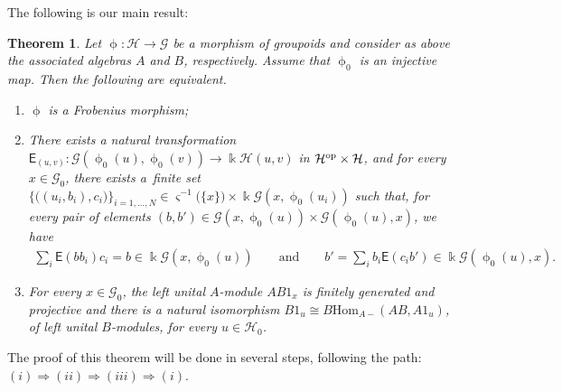 \documentclass[10pt,a4paper]{amsart}
\numberwithin{equation}{section}
\newtheorem{Theorem}{Theorem}[section]
\newcommand{\Sf}[1]{\mathsf{#1}}
\renewcommand{\hom}[3]{\mathrm{Hom}_{\Sscript{#1}}\left(#2, #3\right)}
\newcommand{\Go}{\cG_{\Sscript{0}}}
\newcommand{\Ho}{\cH_{\Sscript{0}}}
\newcommand{\cG}{{\mathcal G}}
\newcommand{\cH}{{\mathcal H}}
\newcommand{\Sscript}[1]{\scriptscriptstyle{#1}}
\newcommand{\phio}{\upphi_{\Sscript{0}}}
\begin{document}
The following is our main result:

\begin{Theorem}\label{thm:FM}Let $\upphi\colon \cH \to \cG$ be a morphism of groupoids and consider as above the associated algebras $A$ and $B$, respectively. Assume that $\upphi_{\Sscript{0}}$ is an injective map. Then the following are equivalent.
\begin{enumerate}[$(i)$]\itemsep=0pt
\item $\upphi$ is a Frobenius morphism;
\item There exists a natural transformation $\Sf{E}_{\Sscript{(u, v)}}\colon \cG(\phio(u),\phio(v)) \longrightarrow \Bbbk \cH(u,v)$ in $\cH^{\rm op} \times \cH$, and for every $x \in \Go$, there exists a~finite set
$\{\big((u_{i},b_{i}), c_{i}\big)\}_{i=1, \dots, N} \in \varsigma^{-1}\big( \{x\}\big)\times \Bbbk \cG(x, \phio(u_{i}))$ such that, for every pair of elements $ (b, b') \in \cG(x, \phio(u)) \times \cG(\phio(u), x)$, we have
\begin{gather*}
\sum_{i}\Sf{E}(bb_{i})c_{i} = b \in \Bbbk \cG(x, \phio(u)) \qquad \text{and} \qquad b' = \sum_{i}b_{i}\Sf{E}(c_{i}b') \in \Bbbk \cG(\phio(u), x).
\end{gather*}
\item For every $x\in \Go$, the left unital $A$-module $AB1_{x}$ is finitely generated and projective and there is a natural isomorphism $B1_{u} \cong B\hom{A-}{AB}{A1_{u}}$, of left unital $B$-modules, for every $u\in \Ho$.
\end{enumerate}
\end{Theorem}


The proof of this theorem will be done in several steps, following the path: $(i) \Rightarrow (ii) \Rightarrow (iii) \Rightarrow (i)$.
\end{document}
